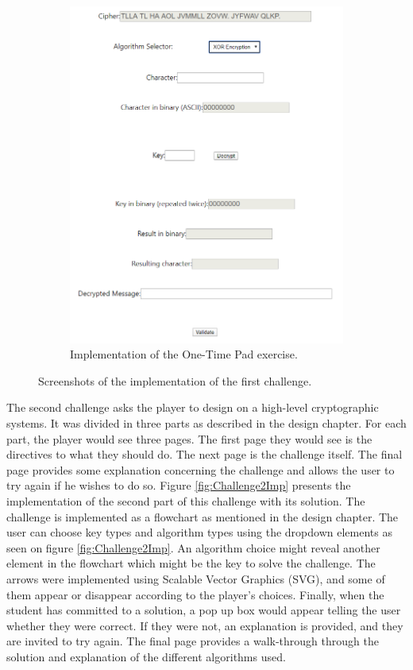 \documentclass{l4proj}
\begin{document}
\begin{figure}
    \begin{subfigure}[b]{0.65\textwidth}
        \includegraphics[width=\textwidth, frame]{images/xORImplementation.PNG}
        \caption{Implementation of the One-Time Pad exercise.}
        \label{fig:xORImp}
    \end{subfigure}
    \caption{Screenshots of the implementation of the first challenge.}
    \label{fig:Challenge1Imp}
\end{figure}

The second challenge asks the player to design on a high-level cryptographic systems.
It was divided in three parts as described in the design chapter.
For each part, the player would see three pages. 
The first page they would see is the directives to what they should do.
The next page is the challenge itself. 
The final page provides some explanation concerning the challenge and allows the user to try again if he wishes to do so.
Figure \ref{fig:Challenge2Imp} presents the implementation of the second part of this challenge with its solution.
The challenge is implemented as a flowchart as mentioned in the design chapter.
The user can choose key types and algorithm types using the dropdown elements as seen on figure \ref{fig:Challenge2Imp}.
An algorithm choice might reveal another element in the flowchart which might be the key to solve the challenge.
The arrows were implemented using Scalable Vector Graphics (SVG), and some of them appear or disappear according to the player's choices.
Finally, when the student has committed to a solution, a pop up box would appear telling the user whether they were correct.
If they were not, an explanation is provided, and they are invited to try again.
The final page provides a walk-through through the solution and explanation of the different algorithms used.
\end{document}
